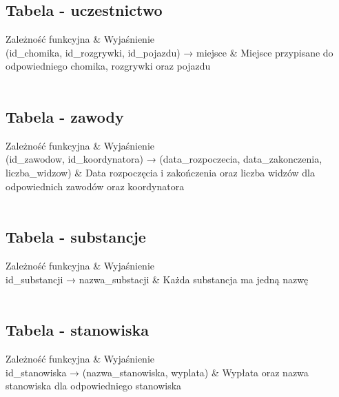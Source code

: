 \documentclass{article}
\begin{document}
\subsection{Tabela - uczestnictwo}

\begin{tcolorbox}[tab2,tabularx={X||X}]
Zależność funkcyjna & Wyjaśnienie     \\
\hline
\hline
(id\_chomika, id\_rozgrywki, id\_pojazdu) → miejsce & Miejsce przypisane do odpowiedniego chomika, rozgrywki oraz pojazdu \\  \\    
\end{tcolorbox}

\subsection{Tabela - zawody}

\begin{tcolorbox}[tab2,tabularx={X||X}]
Zależność funkcyjna & Wyjaśnienie     \\
\hline
\hline
(id\_zawodow, id\_koordynatora) → (data\_rozpoczecia, data\_zakonczenia, liczba\_widzow) & Data rozpoczęcia i zakończenia oraz liczba widzów dla odpowiednich zawodów oraz koordynatora \\  \\    
\end{tcolorbox}

\subsection{Tabela - substancje}

\begin{tcolorbox}[tab2,tabularx={X||X}]
Zależność funkcyjna & Wyjaśnienie     \\
\hline
\hline
id_substancji → nazwa_substacji & Każda substancja ma jedną nazwę \\  \\    
\end{tcolorbox}

\subsection{Tabela - stanowiska}

\begin{tcolorbox}[tab2,tabularx={X||X}]
Zależność funkcyjna & Wyjaśnienie     \\
\hline
\hline
id\_stanowiska → (nazwa\_stanowiska, wyplata) & Wypłata oraz nazwa stanowiska dla odpowiedniego stanowiska \\  \\    
\end{tcolorbox}
\end{document}
